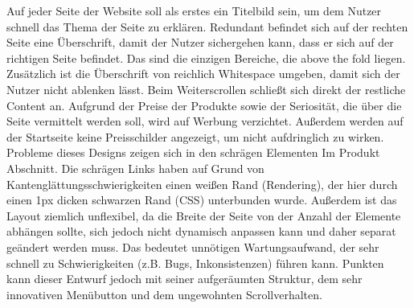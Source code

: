 Auf jeder Seite der Website soll als erstes ein Titelbild sein, um dem Nutzer schnell das Thema der Seite zu erklären. Redundant befindet sich auf der rechten Seite eine Überschrift, damit der Nutzer sichergehen kann, dass er sich auf der richtigen Seite befindet. Das sind die einzigen Bereiche, die above the fold liegen. Zusätzlich ist die Überschrift von reichlich Whitespace umgeben, damit sich der Nutzer nicht ablenken lässt. Beim Weiterscrollen schließt sich direkt der restliche Content an.
Aufgrund der Preise der Produkte sowie der Seriosität, die über die Seite vermittelt werden soll, wird auf Werbung verzichtet. Außerdem werden auf der Startseite keine Preisschilder angezeigt, um nicht aufdringlich zu wirken.
\label{inno_probs}
Probleme dieses Designs zeigen sich in den schrägen Elementen Im Produkt Abschnitt. Die schrägen Links haben auf Grund von Kantenglättungsschwierigkeiten einen weißen Rand (Rendering), der hier durch einen 1px dicken schwarzen Rand (CSS) unterbunden wurde. Außerdem ist das Layout ziemlich unflexibel, da die Breite der Seite von der Anzahl der Elemente abhängen sollte, sich jedoch nicht dynamisch anpassen kann und daher separat geändert werden muss. Das bedeutet unnötigen Wartungsaufwand, der sehr schnell zu Schwierigkeiten (z.B. Bugs, Inkonsistenzen) führen kann.
Punkten kann dieser Entwurf jedoch mit seiner aufgeräumten Struktur, dem sehr innovativen Menübutton und dem ungewohnten Scrollverhalten.
